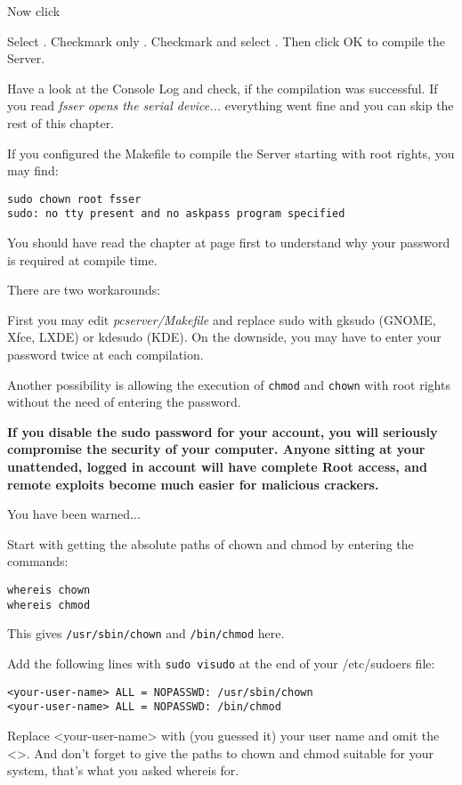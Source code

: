 
\clearpage
Now click  

Select 
. Checkmark only .
Checkmark  and select
. Then click OK to 
compile the Server.


Have a look at the Console Log and check, if the compilation was
successful. If you read \textit{fsser opens the serial device...}
everything went fine and you can skip the rest of this chapter.

If you configured the Makefile to compile the Server starting
with root rights, you may find:

\begin{verbatim}
sudo chown root fsser
sudo: no tty present and no askpass program specified
\end{verbatim}

You should have read the chapter  at page \pageref{rights}
first to understand why your password is required at compile time.

\clearpage
There are two workarounds:

First you may edit \textit{pcserver/Makefile} and replace sudo with 
gksudo (GNOME, Xfce, LXDE) or
kdesudo (KDE). On the downside, you may have to enter your
password twice at each compilation.

Another  possibility is allowing the execution of \texttt{chmod}
and \texttt{chown} with root rights without the need of entering
the password. 

\textbf{If you disable the sudo password for your account, you 
will seriously compromise the security of your computer. Anyone sitting 
at your unattended, logged in account will have complete Root access, 
and remote exploits become much easier for malicious crackers.}

You have been warned...

Start with getting the absolute paths of chown and chmod by entering
the commands:

\begin{verbatim}
whereis chown
whereis chmod
\end{verbatim}

This gives \texttt{/usr/sbin/chown} and \texttt{/bin/chmod} here.

Add the following lines with \texttt{sudo visudo} at the end
of your /etc/sudoers file:

\begin{verbatim}
<your-user-name> ALL = NOPASSWD: /usr/sbin/chown
<your-user-name> ALL = NOPASSWD: /bin/chmod
\end{verbatim}

Replace <your-user-name> with (you guessed it) your user name and
omit the <>. And don't forget to give the paths to chown and chmod
suitable for your system, that's what you asked whereis for.


